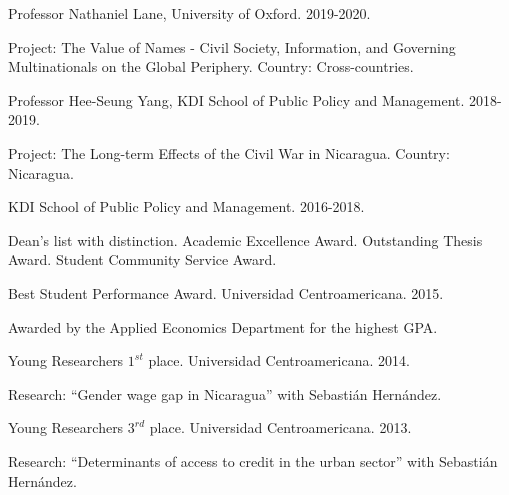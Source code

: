 \documentclass[11pt,article,oneside, a4paper]{memoir}
\begin{document}
\ind Professor Nathaniel Lane, University of Oxford. 2019-2020.

\ind \hspace{0.35in} \footnotesize Project: The Value of Names - Civil Society, Information, and Governing Multinationals on the
Global Periphery. \newline Country: Cross-countries. \normalsize \vspace{0.01in}

\ind Professor Hee-Seung Yang, KDI School of Public Policy and Management. 2018-2019.

\ind \hspace{0.35in} \footnotesize Project: The Long-term Effects of the Civil War in Nicaragua. \newline Country: Nicaragua. \normalsize \vspace{0.01in}

\medskip

\ind KDI School of Public Policy and Management. 2016-2018.

\ind \hspace{0.35in} \footnotesize Dean's list with distinction. Academic Excellence Award. Outstanding Thesis Award. Student Community Service Award. \normalsize \vspace{0.01in}

\ind Best Student Performance Award. Universidad Centroamericana. 2015.

\ind \hspace{0.35in} \footnotesize Awarded by the Applied Economics Department for the highest GPA. \normalsize \vspace{0.01in}

\ind Young Researchers $1^{st}$ place. Universidad Centroamericana. 2014. 

\ind \hspace{0.35in} \footnotesize Research: ``Gender wage gap in Nicaragua'' with Sebastián Hernández. \normalsize \vspace{0.01in}

\ind Young Researchers $3^{rd}$ place. Universidad Centroamericana. 2013. 

\ind \hspace{0.35in} \footnotesize Research: ``Determinants of access to credit in the urban sector'' with Sebastián Hernández. \normalsize \vspace{0.01in}
\end{document}

